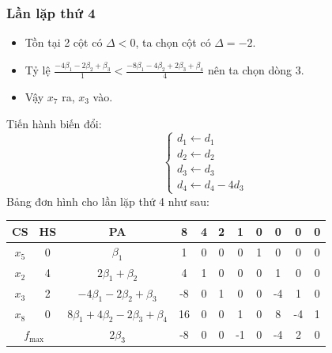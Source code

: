 \documentclass[12pt]{article}
\begin{document}
\subsubsection{Lần lặp thứ 4}
\begin{itemize}
\item Tồn tại 2 cột có $\Delta < 0$, ta chọn cột có $\Delta = -2$.
\item Tỷ lệ $\displaystyle \frac{-4\beta_1 - 2\beta_2 + \beta_3}{1} < \frac{-8\beta_1 - 4\beta_2 + 2\beta_3 + \beta_4}{4}$ nên ta chọn dòng 3.
\item Vậy $x_7$ ra, $x_3$ vào.
\end{itemize}
Tiến hành biến đổi:
$$
\left\{
\begin{array}{lll}
d_1 \leftarrow d_1 \\
d_2 \leftarrow d_2 \\
d_3 \leftarrow d_3\\
d_4 \leftarrow d_4 - 4d_3
\end{array}
\right.
$$
Bảng đơn hình cho lần lặp thứ 4 như sau:
\begin{table}[H]
\centering
\begin{tabular}{|c|c|c|c|c|c|c|c|c|c|c|}
\hline
CS & HS & PA & 8 & 4 & 2 & 1 & 0 & 0 & 0 & 0 \\
\hline
$x_5$ & 0 & $\beta_1$ & 1 & 0 & 0 & 0 & 1 & 0 & 0 & 0 \\
$x_2$ & 4 & $2\beta_1 + \beta_2$ & 4 & 1 & 0 & 0 & 0 & 1 & 0 & 0 \\
$x_3$ & 2 & $-4\beta_1 - 2\beta_2 + \beta_3$ & -8 & 0 & 1 & 0 & 0 & -4 & 1 & 0 \\
$x_8$ & 0 & $8\beta_1 + 4\beta_2 - 2\beta_3 + \beta_4$ & 16 & 0 & 0 & 1 & 0 & 8 & -4 & 1 \\
\hline
\multicolumn{2}{|c|}{$f_{\max}$}
& $2\beta_3$ & -8 & 0 & 0 & -1 & 0 & -4 & 2 & 0 \\
\hline
\end{tabular}
\end{table}
\end{document}
